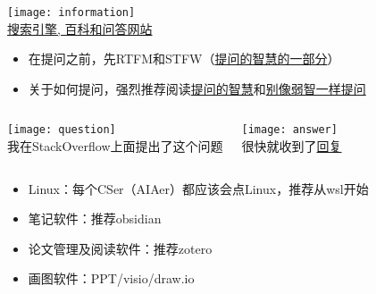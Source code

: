 \documentclass{ctexbeamer} %
\begin{document}
\begin{frame}
	\begin{center}
		\texttt{[image: information]}\\
		\small{\href{https://nju-projectn.github.io/ics-pa-gitbook/ics2020/\#\%E6\%90\%9C\%E7\%B4\%A2\%E5\%BC\%95\%E6\%93\%8E-\%E7\%99\%BE\%E7\%A7\%91\%E5\%92\%8C\%E9\%97\%AE\%E7\%AD\%94\%E7\%BD\%91\%E7\%AB\%99}{搜索引擎, 百科和问答网站}}
	\end{center}
	\begin{itemize}
		\item 在提问之前，先RTFM和STFW（\href{https://github.com/ryanhanwu/How-To-Ask-Questions-The-Smart-Way/blob/main/README-zh_CN.md\#rtfm-\%E5\%92\%8C-stfw\%E5\%A6\%82\%E4\%BD\%95\%E7\%9F\%A5\%E9\%81\%93\%E4\%BD\%A0\%E5\%B7\%B2\%E5\%AE\%8C\%E5\%85\%A8\%E6\%90\%9E\%E7\%A0\%B8\%E4\%BA\%86}{提问的智慧的一部分}）
		\item 关于如何提问，强烈推荐阅读\href{https://github.com/ryanhanwu/How-To-Ask-Questions-The-Smart-Way/blob/main/README-zh_CN.md}{提问的智慧}和\href{https://github.com/tangx/Stop-Ask-Questions-The-Stupid-Ways/blob/master/README.md}{别像弱智一样提问}
	\end{itemize}
\end{frame}

\begin{frame}
	\begin{columns}[T,onlytextwidth]
		\begin{center}
			\texttt{[image: question]}\\
			\small{我在StackOverflow上面提出了这个问题}
		\end{center}
		\begin{center}
			\texttt{[image: answer]}\\
			\small{很快就收到了\href{https://stackoverflow.com/questions/75851718/why-only-the-first-printf-is-outputed-to-the-terminal}{回复}}
		\end{center}
	\end{columns}
\end{frame}

\begin{frame}
	\begin{itemize}
		\item Linux：每个CSer（AIAer）都应该会点Linux，推荐从wsl开始
		\item 笔记软件：推荐obsidian
		\item 论文管理及阅读软件：推荐zotero
		\item 画图软件：PPT/visio/draw.io
	\end{itemize}
\end{frame}
\end{document}
